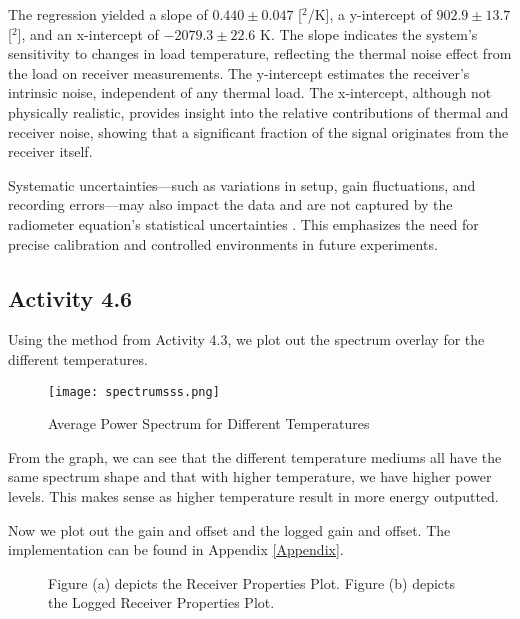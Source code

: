 \documentclass[10pt, preprint]{aastex}
\begin{document}
The regression yielded a slope of \(0.440 \pm 0.047\) [$^2$/K], a y-intercept of \(902.9 \pm 13.7\) [$^2$], and an x-intercept of \(-2079.3 \pm 22.6\) K. The slope indicates the system's sensitivity to changes in load temperature, reflecting the thermal noise effect from the load on receiver measurements. The y-intercept estimates the receiver’s intrinsic noise, independent of any thermal load. The x-intercept, although not physically realistic, provides insight into the relative contributions of thermal and receiver noise, showing that a significant fraction of the signal originates from the receiver itself.

Systematic uncertainties—such as variations in setup, gain fluctuations, and recording errors—may also impact the data and are not captured by the radiometer equation’s statistical uncertainties \cite{chatgpt}. This emphasizes the need for precise calibration and controlled environments in future experiments.

\subsection{Activity 4.6}

Using the method from Activity 4.3, we plot out the spectrum overlay for the different temperatures.

\begin{figure}[H]
\centering
\texttt{[image: spectrumsss.png]}
\caption{\label{fig:spectrumsss}Average Power Spectrum for Different Temperatures}
\end{figure}

From the graph, we can see that the different temperature mediums all have the same spectrum shape and that with higher temperature, we have higher power levels. This makes sense as higher temperature result in more energy outputted. 

Now we plot out the gain and offset and the logged gain and offset. The implementation can be found in Appendix \ref{Appendix}.

\begin{figure}[H]
  \centering
  \hfill
  \caption{\label{fig:spec} Figure (a) depicts the Receiver Properties Plot. Figure (b) depicts the Logged Receiver Properties Plot.}
\end{figure}
\end{document}
